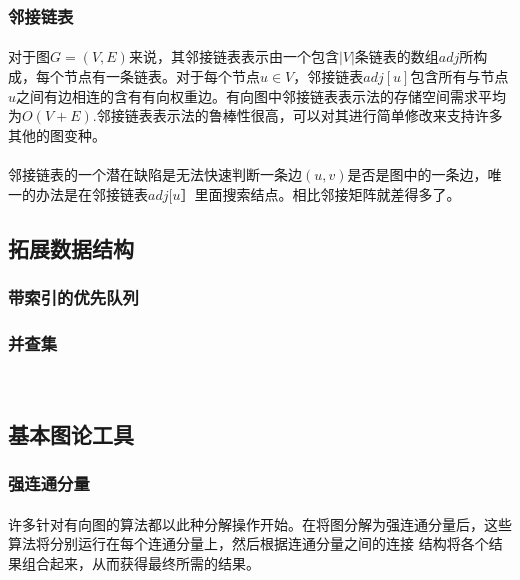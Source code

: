 \documentclass[UTF8,a4paper]{ctexart}
\begin{document}
\subsubsection{邻接链表}
\paragraph{}对于图$G=(V,E)$来说，其邻接链表表示由一个包含$|V|$条链表的数组$adj$所构成，每个节点有一条链表。对于每个节点$u\in V$，邻接链表$adj[u]$包含所有与节点$u$之间有边相连的含有有向权重边。有向图中邻接链表表示法的存储空间需求平均为$O(V+E)$.邻接链表表示法的鲁棒性很高，可以对其进行简单修改来支持许多其他的图变种。
\paragraph{}邻接链表的一个潜在缺陷是无法快速判断一条边$(u, v)$是否是图中的一条边，唯一的办法是在邻接链表$adj[u］$里面搜索结点。相比邻接矩阵就差得多了。

\subsection{拓展数据结构}
\subsubsection{带索引的优先队列~\cite{algs4}}\label{sec:indexedpq}

\subsubsection{并查集}~\cite{introtoalgo}\label{sec:unionfind}
\paragraph{}

\subsection{基本图论工具}
\subsubsection{强连通分量}\label{sec:scc}
\paragraph{}许多针对有向图的算法都以此种分解操作开始。在将图分解为强连通分量后，这些算法将分别运行在每个连通分量上，然后根据连通分量之间的连接 结构将各个结果组合起来，从而获得最终所需的结果。
\end{document}

